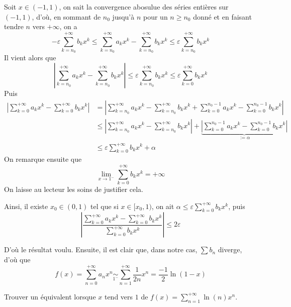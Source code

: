 \begin{solution}
\begin{enumerate}
		Soit $x\in(-1,1)$, on sait la convergence abosulue des séries entières sur $(-1,1)$, d'où, en sommant de $n_0$ jusqu'à $n$ pour un $n\geq n_0$ donné et en faisant tendre $n$ vers $+\infty$, on a 
		\[-\varepsilon\sum_{k=n_0}^{+\infty}b_kx^k\leq \sum_{k=n_0}^{+\infty}a_kx^k-\sum_{k=n_0}^{+\infty}b_kx^k\leq\varepsilon\sum_{k=n_0}^{+\infty}b_kx^k\]
		Il vient alors que \[\left |\sum_{k=n_0}^{+\infty}a_kx^k-\sum_{k=n_0}^{+\infty}b_kx^k \right|\leq \varepsilon\sum_{k=n_0}^{+\infty}b_kx^k\leq\varepsilon\sum_{k=0}^{+\infty}b_kx^k\]
		Puis 
		\begin{align*}
			\left |\sum_{k=0}^{+\infty}a_kx^k-\sum_{k=0}^{+\infty}b_kx^k \right| & =  \left |\sum_{k=n_0}^{+\infty}a_kx^k-\sum_{k=n_0}^{+\infty}b_kx^k + \sum_{k=0}^{n_0-1}a_kx^k-\sum_{k=0}^{n_0-1}b_kx^k\right|\\
																					 & \leq \left |\sum_{k=n_0}^{+\infty}a_kx^k-\sum_{k=n_0}^{+\infty}b_kx^k \right| + \underbrace{\left|\sum_{k=0}^{n_0-1}a_kx^k-\sum_{k=0}^{n_0-1}b_kx^k\right|}_{:=\alpha}\\
																					 & \leq \varepsilon\sum_{k=0}^{+\infty}b_kx^k + \alpha
		\end{align*}
		On remarque ensuite que \[\lim_{x\to1^-}\sum_{k=0}^{+\infty}b_kx^k=+\infty\]
		On laisse au lecteur les soins de justifier cela.


		Ainsi, il existe $x_0\in(0, 1)$ tel que si $x\in[x_0,1)$, on ait $\alpha \leq \varepsilon\displaystyle\sum_{k=0}^{+\infty}b_kx^k$, puis \[\left |\frac{\displaystyle\sum_{k=0}^{+\infty}a_kx^k-\displaystyle\sum_{k=0}^{+\infty}b_kx^k}{\displaystyle\sum_{k=0}^{+\infty}b_kx^k}\right|\leq 2\varepsilon\]



		D'où le résultat voulu. 
		Ensuite, il est clair que, dans notre cas, $\displaystyle\sum b_n$ diverge, d'où que \[\boxed{f(x)=\sum_{n=0}^{+\infty}a_nx^n\underset{1^-}{\sim}\sum_{n=1}^{+\infty}\frac1{2n}x^n=\frac{-1}2\ln(1-x)}\]
	\end{enumerate}
\end{solution}

\begin{exo}
	\label{seriesent2}
	Trouver un équivalent lorsque $x$ tend vers $1$ de $f(x)=\sum_{n=1}^{+\infty}\ln(n)x^n$.
\end{exo}

